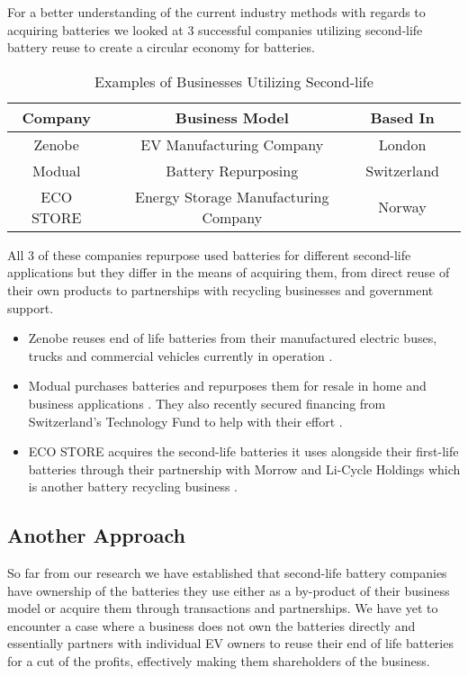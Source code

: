 \documentclass[conference]{IEEEtran}
\begin{document}
For a better understanding of the current industry methods with regards to acquiring batteries we looked at 3 successful companies utilizing second-life battery reuse to create a circular economy for batteries.

\begin{table}[htbp]
\caption{Examples of Businesses Utilizing  Second-life}
\begin{center}
\begin{tabular}{|c|c|c|c|}
\hline
\textbf{Company} & \textbf{Business Model} & \textbf{Based In} \\ \hline
Zenobe & EV Manufacturing Company & London \\ \hline
Modual & Battery Repurposing & Switzerland \\ \hline
ECO STORE & Energy Storage Manufacturing Company & Norway \\ \hline
\end{tabular}
\end{center}
\end{table}

All 3 of these companies repurpose used batteries for different second-life applications but they differ in the means of acquiring them, from direct reuse of their own products to partnerships with recycling businesses and government support.

\begin{itemize}
  \item Zenobe reuses end of life batteries from their manufactured electric buses, trucks and commercial vehicles currently in operation \cite{b5}.
  \item Modual purchases batteries and repurposes them for resale in home and business applications \cite{b6}. They also recently secured financing from Switzerland’s Technology Fund to help with their effort \cite{b7}.
  \item ECO STORE acquires the second-life batteries it uses alongside their first-life batteries through their partnership with Morrow and Li-Cycle Holdings which is another battery recycling business \cite{b8, b9}.
\end{itemize}

\subsection{Another Approach}

So far from our research we have established that second-life battery companies have ownership of the batteries they use either as a by-product of their business model or acquire them through transactions and partnerships. We have yet to encounter a case where a business does not own the batteries directly and essentially partners with individual EV owners to reuse their end of life batteries for a cut of the profits, effectively making them shareholders of the business.
\end{document}
